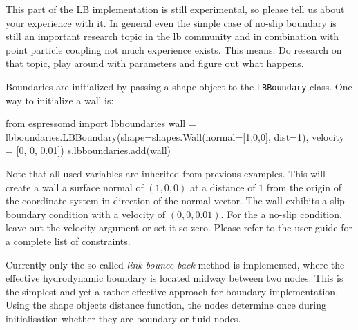 This part of the LB implementation is still experimental,
so please tell us about your experience with it. In general even the simple case of no-slip
boundary is still an important research topic in the lb community and in combination with
point particle coupling not much experience exists. This means: Do research on that topic, play
around with parameters and figure out what happens. 

Boundaries are initialized by passing a shape object to the \texttt{LBBoundary}
class. One way to initialize a wall is:
\begin{pypresso}
  from espressomd import lbboundaries
  wall = lbboundaries.LBBoundary(shape=shapes.Wall(normal=[1,0,0],
                                                   dist=1),
                                 velocity = [0, 0, 0.01])
  s.lbboundaries.add(wall)
\end{pypresso}
Note that all used variables are inherited from previous examples. This will
create a wall a surface normal of $(1,0,0)$ at a distance of $1$ from the origin
of the coordinate system in direction of the normal vector. The wall exhibits a
slip boundary condition with a velocity of $(0,0,0.01)$. For the a no-slip
condition, leave out the velocity argument or set it so zero. Please refer to the
user guide for a complete list of constraints.

Currently only the so called \emph{link bounce back} method is implemented, where the effective
hydrodynamic boundary is located midway between two nodes. This is the simplest and yet a 
rather effective approach for boundary implementation. Using the shape objects
distance function, the nodes determine once during initialisation whether they
are boundary or fluid nodes.

